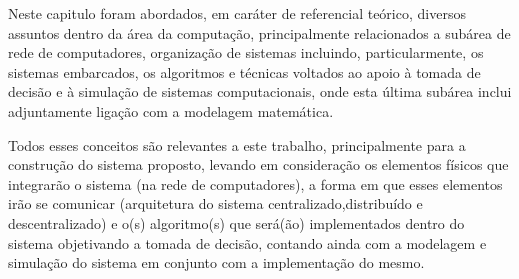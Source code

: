 \par
Neste capitulo foram abordados, em caráter de referencial teórico, diversos assuntos dentro da área da computação, principalmente relacionados a subárea de rede de computadores, organização de sistemas incluindo, particularmente, os sistemas embarcados, os algoritmos e técnicas voltados ao apoio à tomada de decisão e à simulação de sistemas computacionais, onde esta última subárea inclui adjuntamente ligação com a modelagem matemática.
\par
Todos esses conceitos são relevantes a este trabalho, principalmente para a construção do sistema proposto, levando em consideração os elementos físicos que integrarão o sistema (na rede de computadores), a forma em que esses elementos irão se comunicar (arquitetura do sistema centralizado,distribuído e descentralizado) e o(s) algoritmo(s) que será(ão) implementados dentro do sistema objetivando a tomada de decisão, contando ainda com a modelagem e simulação do sistema em conjunto com a implementação do mesmo.
